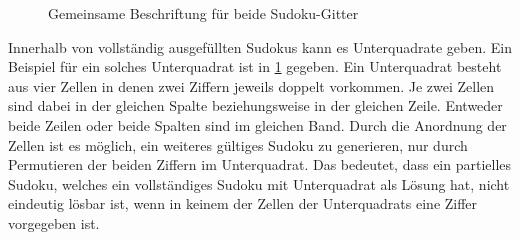 \begin{figure}[H]
\begin{minipage}{0.48\textwidth}
    \end{minipage}
    \caption{Gemeinsame Beschriftung für beide Sudoku-Gitter}
    \label{fig:gemeinsames_sudoku}
\end{figure}

Innerhalb von vollständig ausgefüllten Sudokus kann es Unterquadrate geben.
Ein Beispiel für ein solches Unterquadrat ist in \cref{fig:gemeinsames_sudoku} gegeben.
Ein Unterquadrat besteht aus vier Zellen in denen zwei Ziffern jeweils doppelt vorkommen.
Je zwei Zellen sind dabei in der gleichen Spalte beziehungsweise in der gleichen Zeile.
Entweder beide Zeilen oder beide Spalten sind im gleichen Band.
Durch die Anordnung der Zellen ist es möglich, ein weiteres gültiges Sudoku zu generieren, nur durch Permutieren der beiden Ziffern im Unterquadrat.
Das bedeutet, dass ein partielles Sudoku, welches ein vollständiges Sudoku mit Unterquadrat als Lösung hat, nicht eindeutig lösbar ist,
wenn in keinem der Zellen der Unterquadrats eine Ziffer vorgegeben ist.